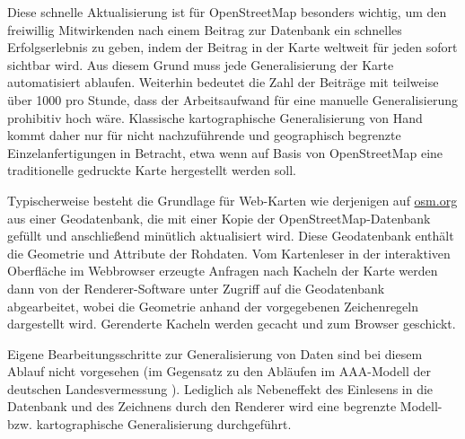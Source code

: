 \documentclass[../main/thesis.tex]{subfiles}
\begin{document}
Diese schnelle Aktualisierung ist für OpenStreetMap besonders wichtig, um den freiwillig Mitwirkenden nach einem Beitrag zur Datenbank ein schnelles Erfolgserlebnis zu geben, indem der Beitrag in der Karte weltweit für jeden sofort sichtbar wird.
Aus diesem Grund muss jede Generalisierung der Karte automatisiert ablaufen.
Weiterhin bedeutet die Zahl der Beiträge mit teilweise über 1000  pro Stunde, 
dass der Arbeitsaufwand für eine manuelle Generalisierung prohibitiv hoch wäre.
Klassische kartographische Generalisierung von Hand kommt daher nur für nicht nachzuführende und geographisch begrenzte Einzelanfertigungen in Betracht, etwa wenn auf Basis von OpenStreetMap eine traditionelle gedruckte Karte hergestellt werden soll.

Typischerweise besteht die Grundlage für Web-Karten wie derjenigen auf \url{osm.org} aus einer Geodatenbank, die mit einer Kopie der OpenStreetMap-Datenbank gefüllt und anschließend minütlich aktualisiert wird.
Diese Geodatenbank enthält die Geometrie und Attribute der Rohdaten.
Vom Kartenleser in der interaktiven Oberfläche im Webbrowser erzeugte Anfragen nach Kacheln der Karte werden dann von der Renderer-Software unter Zugriff auf die Geodatenbank abgearbeitet, wobei die Geometrie anhand der vorgegebenen Zeichenregeln dargestellt wird.
Gerenderte Kacheln werden gecacht und zum Browser geschickt.

Eigene Bearbeitungsschritte zur Generalisierung von Daten sind bei diesem Ablauf nicht vorgesehen (im Gegensatz zu den Abläufen im AAA-Modell der deutschen Landesvermessung ).
Lediglich als Nebeneffekt des Einlesens in die Datenbank und des Zeichnens durch den Renderer wird eine begrenzte Modell- bzw. kartographische Generalisierung durchgeführt. 

\end{document}
